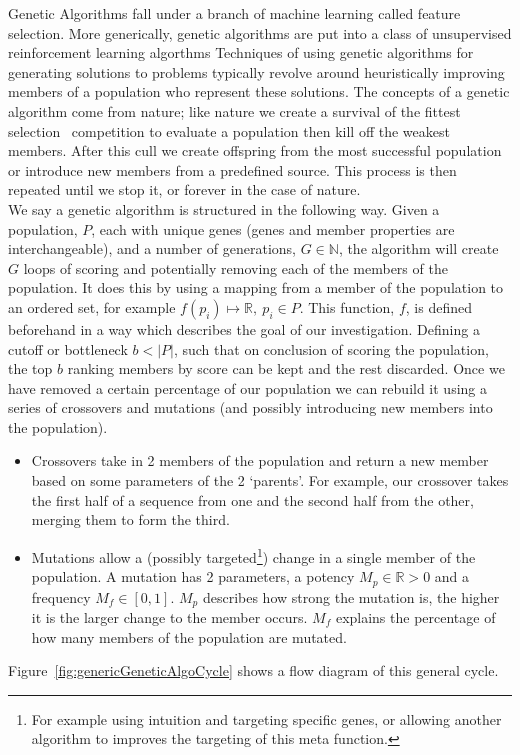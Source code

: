 Genetic Algorithms fall under a branch of machine learning called feature selection.
More generically, genetic algorithms are put into a class of unsupervised reinforcement learning algorthms
Techniques of using genetic algorithms for generating solutions to problems typically revolve around heuristically improving members of a population who represent these solutions.
The concepts of a genetic algorithm come from nature;
like nature we create a survival of the fittest selection~\cite{darwin2009origin} competition to evaluate a population then kill off the weakest members.
After this cull we create offspring from the most successful population or introduce new members from a predefined source.
This process is then repeated until we stop it, or forever in the case of nature.\\

We say a genetic algorithm is structured in the following way.
Given a population, \(P\), each with unique genes (genes and member properties are interchangeable), and a number of generations, \(G\in \mathbb{N}\), the algorithm will create \(G\) loops of scoring and potentially removing each of the members of the population.
It does this by using a mapping from a member of the population to an ordered set, for example \(f(p_i)\mapsto \mathbb{R},\ p_i \in P\).
This function, \(f\), is defined beforehand in a way which describes the goal of our investigation.
Defining a cutoff or bottleneck \(b<|P|\), such that on conclusion of scoring the population, the top \(b\) ranking members by score can be kept and the rest discarded.
Once we have removed a certain percentage of our population we can rebuild it using a series of crossovers and mutations (and possibly introducing new members into the population).
\begin{itemize}
    \item Crossovers take in 2 members of the population and return a new member based on some parameters of the 2 `parents'.
    For example, our crossover takes the first half of a sequence from one and the second half from the other, merging them to form the third.
    \item Mutations allow a (possibly targeted\footnote{For example using intuition and targeting specific genes, or allowing another algorithm to improves the targeting of this meta function.}) change in a single member of the population.
    A mutation has 2 parameters, a potency \(M_p\in \mathbb{R}>0\) and a frequency \(M_f\in [0,1]\).
    \(M_p\) describes how strong the mutation is, the higher it is the larger change to the member occurs.
    \(M_f\) explains the percentage of how many members of the population are mutated.
\end{itemize}
Figure~\ref{fig:genericGeneticAlgoCycle} shows a flow diagram of this general cycle.\\

